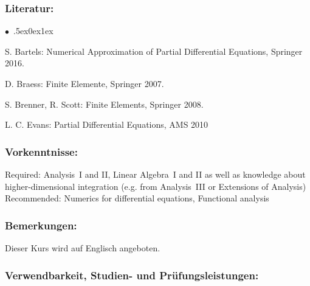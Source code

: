 \documentclass[a4paper,10pt]{article}
\renewenvironment{itemize}{\begin{list}{$\bullet$\ }{\itemsep.5ex\setlength{\topsep}{0.5\itemsep}\parsep0ex\labelsep1ex\settowidth{\labelwidth}{$\bullet$\ }\setlength{\leftmargin}{\labelwidth}\addtolength{\leftmargin}{3ex}\addtolength{\leftmargin}{\labelsep}}}{\end{list}}
\begin{document}
\subsubsection*{\large
    Literatur:
}
\begin{itemize}
\item  S. Bartels: Numerical Approximation of Partial Differential Equations, Springer 2016. 
\item  D. Braess: Finite Elemente, Springer 2007. 
\item  S. Brenner, R. Scott: Finite Elements, Springer 2008. 
\item  L. C. Evans: Partial Differential Equations, AMS 2010
\end{itemize}
\subsubsection*{\large
    Vorkenntnisse:
}
Required: Analysis~I and II, Linear Algebra~I and II as well as knowledge about higher-dimensional integration (e.g. from Analysis~III or Extensions of Analysis) \\
Recommended:  Numerics for differential equations, Functional analysis
\subsubsection*{\large
    Bemerkungen:
}
Dieser Kurs wird auf Englisch angeboten.
\subsubsection*{\large
    Verwendbarkeit, Studien- und Prüfungsleistungen:
}
\end{document}
